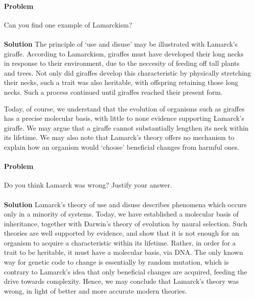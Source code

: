 \documentclass[10pt]{article}
\newcounter{prob}
\def\problem{\stepcounter{prob}\paragraph{Problem \arabic{prob}}}
\def\solution{\\\\\textbf{Solution }}
\begin{document}
        \problem Can you find one example of Lamarckism?
        \solution The principle of `use and disuse' may be illustrated with Lamarck's giraffe. According to Lamarckism, giraffes must have
        developed their long necks in response to their environment, due to the neccesity of feeding off tall plants and trees. Not only
        did giraffes develop this characteristic by physically stretching their necks, such a trait was also heritable, with
        offspring retaining those long necks. Such a process continued until giraffes reached their present form.

        Today, of course, we understand that the evolution of organisms such as giraffes has a precise molecular basis, with little to 
        none evidence supporting Lamarck's giraffe. We may argue that a giraffe cannot substantially lengthen its neck within its
        lifetime. We may also note that Lamarck's theory offers no mechanism to explain how an organism would `choose' beneficial changes
        from harmful ones.

        \problem Do you think Lamarck was wrong? Justify your answer.
        \solution Lamarck's theory of use and disuse describes phenomena which occurs only in a minority of systems. Today, we have
        established a molecular basis of inheritance, together with Darwin's theory of evolution by naural selection. Such theories
        are well supported by evidence, and show that it is not enough for an organism to acquire a characteristic within its lifetime.
        Rather, in order for a trait to be heritable, it must have a molecular basis, via DNA. The only known way for genetic code
        to change is essentially by random mutation, which is contrary to Lamarck's idea that only beneficial changes are acquired, feeding the 
        drive towards complexity. Hence, we may conclude that Lamarck's theory was wrong, in light of better and more accurate modern theories.
\end{document}
